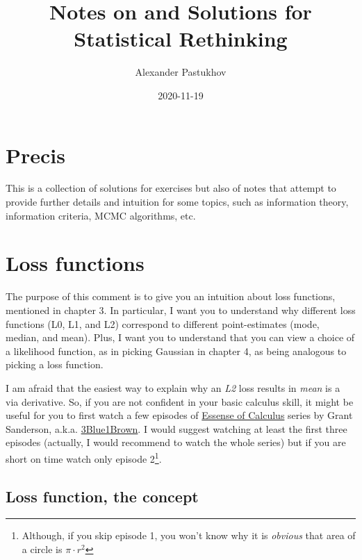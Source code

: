 \documentclass[
]{book}
\title{Notes on and Solutions for Statistical Rethinking}
\author{Alexander Pastukhov}
\date{2020-11-19}
\begin{document}
\maketitle

{
\setcounter{tocdepth}{1}
\tableofcontents
}
\hypertarget{precis}{%
\chapter{Precis}\label{precis}}

This is a collection of solutions for exercises but also of notes that attempt to provide further details and intuition for some topics, such as information theory, information criteria, MCMC algorithms, etc.

\hypertarget{loss-functions}{%
\chapter{Loss functions}\label{loss-functions}}

The purpose of this comment is to give you an intuition about loss functions, mentioned in chapter 3. In particular, I want you to understand why different loss functions (L0, L1, and L2) correspond to different point-estimates (mode, median, and mean). Plus, I want you to understand that you can view a choice of a likelihood function, as in picking Gaussian in chapter 4, as being analogous to picking a loss function.

I am afraid that the easiest way to explain why an \emph{L2} loss results in \emph{mean} is a via derivative. So, if you are not confident in your basic calculus skill, it might be useful for you to first watch a few episodes of \href{https://www.youtube.com/playlist?list=PLZHQObOWTQDMsr9K-rj53DwVRMYO3t5Yr}{Essense of Calculus} series by Grant Sanderson, a.k.a. \href{https://www.3blue1brown.com/}{3Blue1Brown}. I would suggest watching at least the first three episodes (actually, I would recommend to watch the whole series) but if you are short on time watch only episode 2\footnote{Although, if you skip episode 1, you won't know why it is \emph{obvious} that area of a circle is \(\pi\cdot r^2\)}.

\hypertarget{loss-function-the-concept}{%
\section{Loss function, the concept}\label{loss-function-the-concept}}
\end{document}
